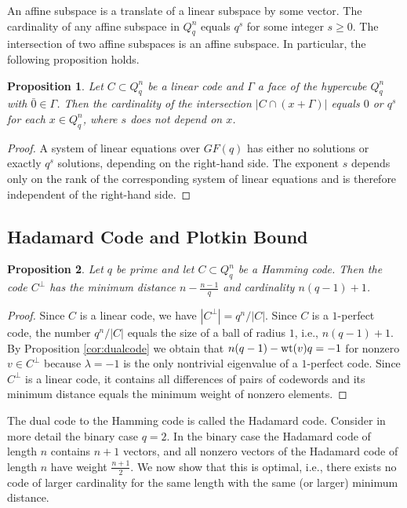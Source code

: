 \documentclass[11pt]{article}
\newtheorem{claim}{Proposition}[section]
\theoremstyle{definition}
\newcommand{\wt}{{\rm wt}}
\begin{document}
{{{An affine subspace is a translate of a linear subspace
by some vector. The cardinality of any affine subspace in
$Q_q^n$ equals $q^s$ for some integer $s\geq0$. The intersection
of two affine subspaces is an affine subspace. In
particular, the following proposition holds.





\begin{claim}\label{pvs111} Let $C\subset Q_q^n$ be a linear code and
$\Gamma$ a face of the hypercube $Q_q^n$ with $\bar{0}\in
\Gamma$. Then the cardinality of the intersection $|C\cap (x+\Gamma)|$ equals $0$
    or $q^s$ for each $x\in Q_q^n$, where $s$ does not depend on $x$.
\end{claim}
\begin{proof}
A system of linear equations over  $GF(q)$ has  either no solutions  or  exactly $q^s$
solutions, depending on the right-hand side. 
The exponent $s$ depends only on the rank of the corresponding system of linear equations and is therefore independent of the right-hand side.
\end{proof}




\subsection{Hadamard Code and Plotkin Bound}





\begin{claim}\label{claim:Hadamard}
Let $q$ be prime and let $C\subset Q_q^n$ be  a Hamming code. Then the code $C^\perp$ has the minimum distance $n-\frac{n-1}{q}$ and cardinality $n(q-1)+1$.
\end{claim}
\begin{proof}
Since $C$ is a linear code, we have $|C^\perp|=q^n/|C|$. Since $C$ is a $1$-perfect code, the number $q^n/|C|$ equals the size of a ball of radius $1$, i.e.,  $n(q-1)+1$.  By  Proposition \ref{cor:dualcode} we obtain that  $n(q-1)-\wt(v)q=-1$ for nonzero $v\in C^\perp$  because $\lambda=-1$ is the only  nontrivial eigenvalue of a $1$-perfect code. Since  $C^\perp$ is a linear code, it contains all differences of pairs of codewords and its minimum distance equals the minimum weight of nonzero elements.
\end{proof}

The  dual code to the Hamming code is called the Hadamard code. Consider in more detail the binary case $q=2$. In the binary case the Hadamard code of length $n$ contains $n+1$ vectors, and all nonzero vectors of the Hadamard code of length $n$ have weight $\frac{n+1}{2}$. We now show that this is  optimal, i.e., there exists no code of larger cardinality for the same length with the same (or larger) minimum distance.

}}}
\end{document}

